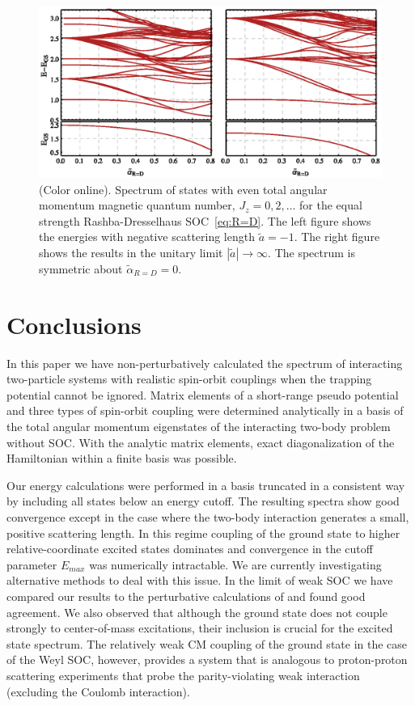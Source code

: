 \documentclass[%
 notitlepage,
 preprint,
showpacs,%
 amsmath,amssymb,
 aps,
pra,
]{revtex4-1}
\begin{document}
\begin{figure}
\includegraphics{Figures/RashbaDresselhausSpectrum}
\caption{\label{fig:R=DExcitationSpectrum} (Color online). 
Spectrum of states with even total angular momentum magnetic quantum number, $J_z=0,2,\dots$ for the equal strength Rashba-Dresselhaus SOC~\eqref{eq:R=D}. The left figure shows the energies with negative scattering length $\tilde{a}=-1$. The right figure shows the results in the unitary limit $|\tilde{a}|\rightarrow\infty$. The spectrum is symmetric about $\tilde{\alpha}_{R=D}=0$.} 
\end{figure}


\section{Conclusions}

\color{red}
In this paper we have non-perturbatively calculated the spectrum of interacting two-particle systems with realistic spin-orbit couplings when the trapping potential cannot be ignored.  Matrix elements of a short-range pseudo potential and three types of spin-orbit coupling were determined analytically in a basis of the total angular momentum eigenstates of the interacting two-body problem without SOC. With the analytic matrix elements, exact diagonalization of the Hamiltonian within a finite basis was possible.

Our energy calculations were performed in a basis truncated in a consistent way by including all states below an energy cutoff. The resulting spectra show good convergence \color{black} except in the case where the two-body interaction generates a small, positive scattering length. In this regime coupling of the ground state to higher relative-coordinate excited states dominates and convergence in the cutoff parameter $E_{max}$ was numerically intractable. We are currently investigating alternative methods to deal with this issue. In the limit of weak SOC we have compared our results to the perturbative calculations of \cite{PhysRevA.89.033606} and found good agreement. We also observed that although the ground state does not couple strongly to center-of-mass excitations, their inclusion is crucial for the excited state spectrum.  The relatively weak CM coupling of the ground state in the case of the Weyl SOC, however, provides a system that is analogous to proton-proton scattering experiments that probe the parity-violating weak interaction (excluding the Coulomb interaction). 
\end{document}
